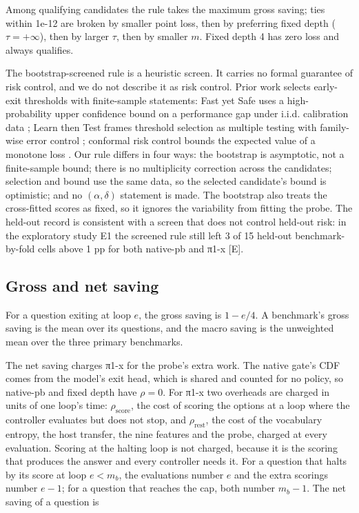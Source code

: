 Among qualifying candidates the rule takes the maximum gross saving; ties within 1e-12 are broken by smaller point loss, then by preferring fixed depth (\(\tau = +\infty\)), then by larger \(\tau\), then by smaller \(m\). Fixed depth 4 has zero loss and always qualifies.

The bootstrap-screened rule is a heuristic screen. It carries no formal guarantee of risk control, and we do not describe it as risk control. Prior work selects early-exit thresholds with finite-sample statements: Fast yet Safe uses a high-probability upper confidence bound on a performance gap under i.i.d. calibration data \citep{Jazbec2024}; Learn then Test frames threshold selection as multiple testing with family-wise error control \citep{Angelopoulos2025LTT}; conformal risk control bounds the expected value of a monotone loss \citep{Angelopoulos2024CRC}. Our rule differs in four ways: the bootstrap is asymptotic, not a finite-sample bound; there is no multiplicity correction across the candidates; selection and bound use the same data, so the selected candidate's bound is optimistic; and no \((\alpha, \delta)\) statement is made. The bootstrap also treats the cross-fitted scores as fixed, so it ignores the variability from fitting the probe. The held-out record is consistent with a screen that does not control held-out risk: in the exploratory study E1 the screened rule still left 3 of 15 held-out benchmark-by-fold cells above 1 pp for both native-pb and π1-x {[}E{]}.

\subsection{Gross and net saving}

For a question exiting at loop \(e\), the gross saving is \(1 - e/4\). A benchmark's gross saving is the mean over its questions, and the macro saving is the unweighted mean over the three primary benchmarks.

The net saving charges π1-x for the probe's extra work. The native gate's CDF comes from the model's exit head, which is shared and counted for no policy, so native-pb and fixed depth have \(\rho = 0\). For π1-x two overheads are charged in units of one loop's time: \(\rho_{\text{score}}\), the cost of scoring the options at a loop where the controller evaluates but does not stop, and \(\rho_{\text{rest}}\), the cost of the vocabulary entropy, the host transfer, the nine features and the probe, charged at every evaluation. Scoring at the halting loop is not charged, because it is the scoring that produces the answer and every controller needs it. For a question that halts by its score at loop \(e < m_b\), the evaluations number \(e\) and the extra scorings number \(e-1\); for a question that reaches the cap, both number \(m_b - 1\). The net saving of a question is

